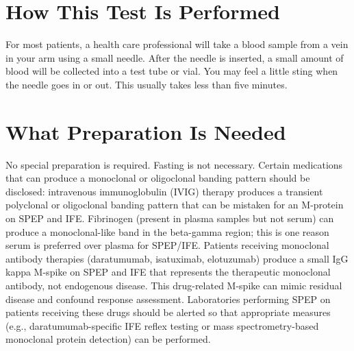 \section*{How This Test Is Performed}
For most patients, a health care professional will take a blood sample from a vein in your arm using a small needle. After the needle is inserted, a small amount of blood will be collected into a test tube or vial. You may feel a little sting when the needle goes in or out. This usually takes less than five minutes.

\section*{What Preparation Is Needed}
No special preparation is required. Fasting is not necessary. Certain medications that can produce a monoclonal or oligoclonal banding pattern should be disclosed: intravenous immunoglobulin (IVIG) therapy produces a transient polyclonal or oligoclonal banding pattern that can be mistaken for an M-protein on SPEP and IFE. Fibrinogen (present in plasma samples but not serum) can produce a monoclonal-like band in the beta-gamma region; this is one reason serum is preferred over plasma for SPEP/IFE. Patients receiving monoclonal antibody therapies (daratumumab, isatuximab, elotuzumab) produce a small IgG kappa M-spike on SPEP and IFE that represents the therapeutic monoclonal antibody, not endogenous disease. This drug-related M-spike can mimic residual disease and confound response assessment. Laboratories performing SPEP on patients receiving these drugs should be alerted so that appropriate measures (e.g., daratumumab-specific IFE reflex testing or mass spectrometry-based monoclonal protein detection) can be performed.

